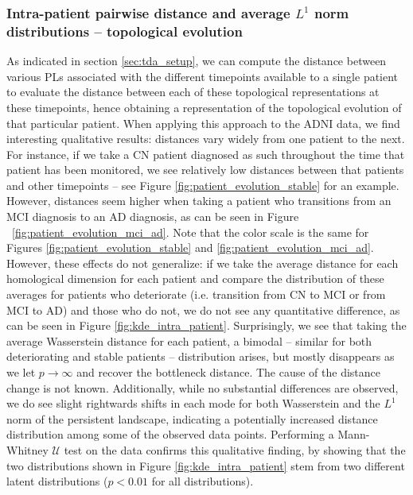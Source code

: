 \documentclass{article}
\begin{document}
\subsubsection{Intra-patient pairwise distance and average $L^1$ norm distributions -- topological
  evolution}

As indicated in section \ref{sec:tda_setup}, we can compute the distance between various PLs
associated with the different timepoints available to a single patient to evaluate the distance
between each of these topological representations at these timepoints, hence obtaining a
representation of the topological evolution of that particular patient. When applying this approach
to the ADNI data, we find interesting qualitative results: distances vary widely from one patient to
the next. For instance, if we take a CN patient diagnosed as such throughout the time that patient
has been monitored, we see relatively low distances between that patients and other timepoints --
see Figure \ref{fig:patient_evolution_stable} for an example. However, distances seem higher when
taking a patient who transitions from an MCI diagnosis to an AD diagnosis, as can be seen in Figure
~\ref{fig:patient_evolution_mci_ad}. Note that the color scale is the same for Figures
\ref{fig:patient_evolution_stable} and \ref{fig:patient_evolution_mci_ad}. However, these effects do
not generalize: if we take the average distance for each homological dimension for each patient and
compare the distribution of these averages for patients who deteriorate (i.e. transition from CN to
MCI or from MCI to AD) and those who do not, we do not see any quantitative difference, as can be
seen in Figure \ref{fig:kde_intra_patient}. Surprisingly, we see that taking the average Wasserstein
distance for each patient, a bimodal -- similar for both deteriorating and stable patients --
distribution arises, but mostly disappears as we let $p\to\infty$ and recover the bottleneck
distance. The cause of the distance change is not known. Additionally, while no substantial
differences are observed, we do see slight rightwards shifts in each mode for both Wasserstein and
the $L^1$ norm of the persistent landscape, indicating a potentially increased distance distribution
among some of the observed data points. Performing a Mann-Whitney $\mathcal{U}$ test on the data
confirms this qualitative finding, by showing that the two distributions shown in Figure
\ref{fig:kde_intra_patient} stem from two different latent distributions ($p<0.01$ for all
distributions).
\end{document}
